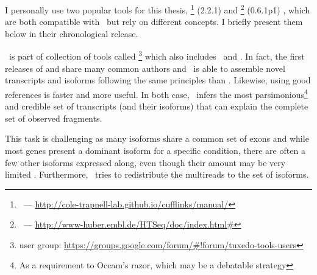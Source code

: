 I personally use two popular tools for this thesis,
\cuffl\footnote{\cuffl\ ---
\href{http://cole-trapnell-lab.github.io/cufflinks/manual/}%
{http://cole-trapnell-lab.github.io/cufflinks/manual/}} (2.2.1)
 and
\htseq\footnote{\htseq\ ---
\href{http://www-huber.embl.de/HTSeq/doc/index.html\#}%
{http://www-huber.embl.de/HTSeq/doc/index.html\#}} (0.6.1p1)
,
which are both compatible with \toph\ but rely on different concepts.
I briefly present them below in their chronological release.

\cuffl\ is part of collection of tools called
\footnote{ user group:
\href{https://groups.google.com/forum/\#!forum/tuxedo-tools-users}%
{https://groups.google.com/forum/\#!forum/tuxedo-tools-users}} which also includes
\toph\ and . In fact, the first releases of  and
 share many common authors and \cuffl\ is able to assemble
 novel transcripts and isoforms following the same principles
than \toph. Likewise, using good references is faster and more useful.
In both case, \cuffl\ infers the most parsimonious\footnote{As a requirement to
Occam's razor, which may be a debatable strategy }
and credible set of transcripts (and their isoforms) that can explain the
complete set of observed fragments.

This task is challenging as many isoforms share a common set of exons and
while most genes present a dominant isoform for a specific condition,
there are often a few other isoforms expressed along, even though their amount
may be very limited . Furthermore, \cuffl\ tries to
redistribute the multireads to the set of isoforms.

